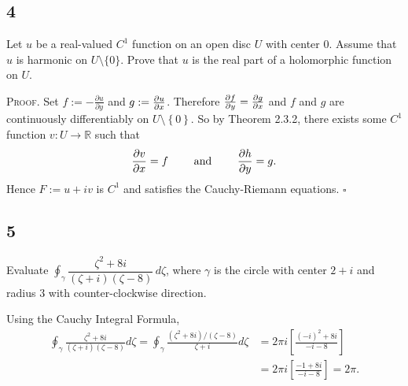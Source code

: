 \documentclass[12pt]{article}
\newcounter{ProofCounter}
\newenvironment{Proof}{\stepcounter{ProofCounter}\textsc{Proof.}}{\hfill$\square$}
\begin{document}
\subsection*{4}
\begin{tcolorbox}
Let $u$ be a real-valued $C^1$ function on an open disc $U$ with center $0$. Assume that $u$ is harmonic on
$U\setminus\{0\}$. Prove that $u$ is the real part of a holomorphic
function on $U$.
\end{tcolorbox}
\begin{Proof}
Set $f := -\frac{\partial u}{\partial y}$ and $g := \frac{\partial u}{\partial x}$. Therefore $\frac{\partial f}{\partial y} = \frac{\partial g}{\partial x}$ and $f$ and $g$
are continuously differentiably on $U \setminus \left\{ 0 \right\}$. So by Theorem 2.3.2, there exists some $C^{1}$ function $v : U \rightarrow
\mathbb{R}$ such that 
\[ \frac{\partial v}{\partial x} = f \qquad \text{ and } \qquad \frac{\partial h}{\partial y} = g. \]
Hence $F := u + iv$ is $C^{1}$ and satisfies the Cauchy-Riemann equations.
\end{Proof}


\subsection*{5}
\begin{tcolorbox}
Evaluate
$\oint_\gamma \dfrac{\zeta^2+8i}{(\zeta+i)(\zeta-8)}\,d\zeta$,
where $\gamma$ is the circle with center $2+ i$ and radius $3$ with
counter-clockwise direction.
\end{tcolorbox}
Using the Cauchy Integral Formula,
\begin{align*}
\oint_{\gamma}\frac{\zeta^2 + 8i}{(\zeta + i)(\zeta - 8)}d\zeta = \oint_{\gamma} \frac{(\zeta^2 + 8i)/(\zeta - 8)}{\zeta + i}d\zeta & = 2\pi i
\left[ \frac{(-i)^2 + 8i}{-i - 8} \right] \\
& = 2\pi i \left[ \frac{-1 + 8i}{-i - 8} \right] = 2\pi.
\end{align*}
\end{document}
